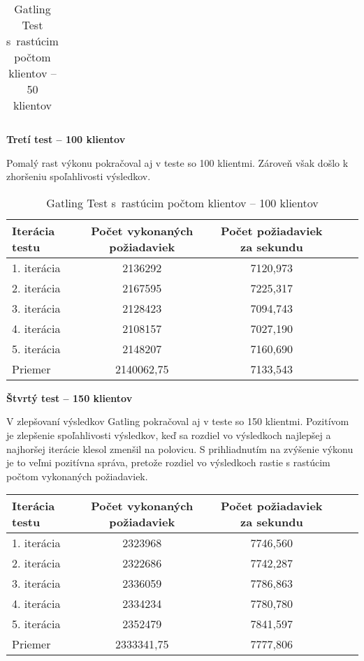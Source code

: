 \documentclass[12pt,oneside,final]{fithesis-utf8}
\begin{document}
\begin{itemize}
\begin{table}[H]
\begin{center}
\begin{tabular}{ | l | c | c | c | c |}
\end{tabular}
\end{center}
\caption{Gatling Test s~rastúcim počtom klientov -- 50 klientov}
\end{table}


\textbf{Tretí test -- 100 klientov}

Pomalý rast výkonu pokračoval aj v teste so 100 klientmi. Zároveň však došlo k zhoršeniu spoľahlivosti výsledkov.

\begin{table}[H]
\begin{center}
\begin{tabular}{ | l | c | c | c | c |}
		\hline
		 \textbf{Iterácia testu} & \textbf{Počet vykonaných požiadaviek} & \textbf{Počet požiadaviek za sekundu} \\ \hline
		 1. iterácia & 2136292 & 7120,973 \\ \hline
		 2. iterácia & 2167595 & 7225,317 \\ \hline
		 3. iterácia & 2128423 & 7094,743 \\ \hline
		 4. iterácia & 2108157 & 7027,190 \\ \hline
		 5. iterácia & 2148207 & 7160,690 \\ \hline
		 Priemer & 2140062,75 & 7133,543 \\ \hline
		 
\end{tabular}
\end{center}
\caption{Gatling Test s~rastúcim počtom klientov -- 100 klientov}
\end{table}


\textbf{Štvrtý test -- 150 klientov}

V zlepšovaní výsledkov Gatling pokračoval aj v teste so 150 klientmi. Pozitívom je zlepšenie spoľahlivosti výsledkov, keď sa rozdiel vo výsledkoch najlepšej a najhoršej iterácie klesol zmenšil na polovicu. S prihliadnutím na zvýšenie výkonu je to veľmi pozitívna správa, pretože rozdiel vo výsledkoch rastie s rastúcim počtom vykonaných požiadaviek.

\begin{table}[H]
\begin{center}
\begin{tabular}{ | l | c | c | c | c |}
		\hline
		 \textbf{Iterácia testu} & \textbf{Počet vykonaných požiadaviek} & \textbf{Počet požiadaviek za sekundu} \\ \hline
		 1. iterácia & 2323968 & 7746,560 \\ \hline
		 2. iterácia & 2322686 & 7742,287 \\ \hline
		 3. iterácia & 2336059 & 7786,863 \\ \hline
		 4. iterácia & 2334234 & 7780,780 \\ \hline
		 5. iterácia & 2352479 & 7841,597 \\ \hline
		 Priemer & 2333341,75 & 7777,806 \\ \hline
		 

\end{tabular}
\end{center}
\end{table}
\end{itemize}
\end{document}
